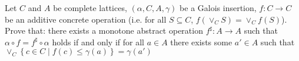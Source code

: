 \begin{exercise}{
    Let $C$ and $A$ be complete lattices, $(\alpha, C, A, \gamma)$ be a Galois insertion, $f: C \to C$ be an additive concrete operation (i.e. for all $S \subseteq C$, $f(\vee_C S) = \vee_C f(S)$). Prove that: there exists a monotone abstract operation $f^\sharp: A \to A$ such that $\alpha \circ f = f^\sharp \circ \alpha$ holds if and only if for all $a \in A$ there exists some $a' \in A$ such that $\vee_C \left\{ c \in C \mid f(c) \leq \gamma(a) \right\} = \gamma(a')$
}
    
\end{exercise}
